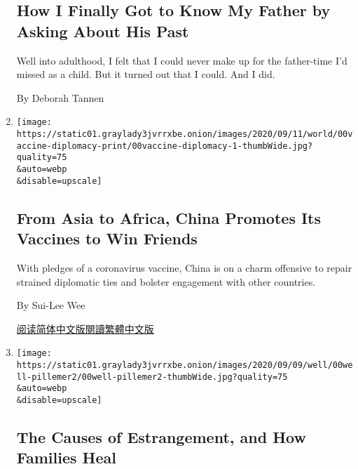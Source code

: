 \begin{enumerate}
  \hypertarget{how-i-finally-got-to-know-my-father-by-asking-about-his-past}{%
  \subsection{How I Finally Got to Know My Father by Asking About His
  Past}\label{how-i-finally-got-to-know-my-father-by-asking-about-his-past}}

  Well into adulthood, I felt that I could never make up for the
  father-time I'd missed as a child. But it turned out that I could. And
  I did.

  By Deborah Tannen
\item
  \href{/2020/09/11/business/china-vaccine-diplomacy.html}{}

  \texttt{[image: https://static01.graylady3jvrrxbe.onion/images/2020/09/11/world/00vaccine-diplomacy-print/00vaccine-diplomacy-1-thumbWide.jpg?quality=75\\\&auto=webp\\\&disable=upscale]}

  \hypertarget{from-asia-to-africa-china-promotes-its-vaccines-to-win-friends}{%
  \subsection{From Asia to Africa, China Promotes Its Vaccines to Win
  Friends}\label{from-asia-to-africa-china-promotes-its-vaccines-to-win-friends}}

  With pledges of a coronavirus vaccine, China is on a charm offensive
  to repair strained diplomatic ties and bolster engagement with other
  countries.

  By Sui-Lee Wee

  \href{https://cn.nytimes3xbfgragh.onion/business/20200911/china-vaccine-diplomacy/}{阅读简体中文版}\href{https://cn.nytimes3xbfgragh.onion/business/20200911/china-vaccine-diplomacy/zh-hant/}{閱讀繁體中文版}
\item
  \href{/2020/09/10/well/family/family-estrangement.html}{}

  \texttt{[image: https://static01.graylady3jvrrxbe.onion/images/2020/09/09/well/00well-pillemer2/00well-pillemer2-thumbWide.jpg?quality=75\\\&auto=webp\\\&disable=upscale]}

  \hypertarget{the-causes-of-estrangement-and-how-families-heal}{%
  \subsection{The Causes of Estrangement, and How Families
  Heal}\label{the-causes-of-estrangement-and-how-families-heal}}


\end{enumerate}
